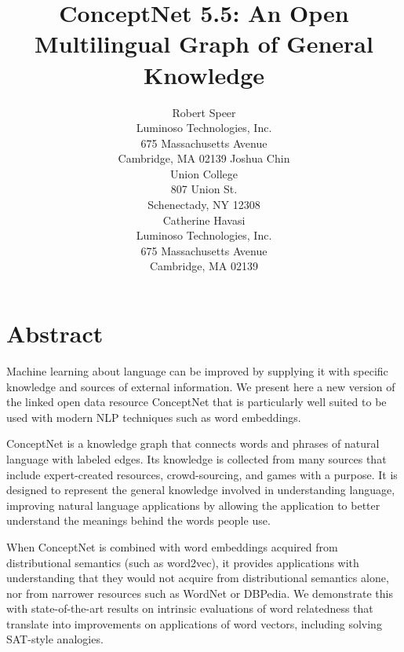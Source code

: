 \documentclass[letterpaper]{article}
\begin{document}
\title{ConceptNet 5.5: An Open Multilingual Graph of General Knowledge}
\author{Robert Speer\\
    Luminoso Technologies, Inc.\\
    675 Massachusetts Avenue\\
    Cambridge, MA 02139
\And
    Joshua Chin\\
    Union College\\
    807 Union St.\\
    Schenectady, NY 12308\\
\And
    Catherine Havasi\\
    Luminoso Technologies, Inc.\\
    675 Massachusetts Avenue\\
    Cambridge, MA 02139
}

\maketitle


\section{Abstract}\label{abstract}

Machine learning about language can be improved by supplying it with specific knowledge and sources of external information. We present here a new version of the linked open data resource ConceptNet that is particularly well suited to be used with modern NLP techniques such as word embeddings.

ConceptNet is a knowledge graph that connects words and phrases of natural language with labeled edges. Its knowledge is collected from many sources that include expert-created resources, crowd-sourcing, and games with a purpose. It is designed to represent the general knowledge involved in understanding language, improving natural language applications by allowing the application to better understand the meanings behind the words people use.

When ConceptNet is combined with word embeddings acquired from distributional semantics (such as word2vec), it provides applications with understanding that they would not acquire from distributional semantics alone, nor from narrower resources such as WordNet or DBPedia. We demonstrate this with state-of-the-art results on intrinsic evaluations of word relatedness that translate into improvements on applications of word vectors, including solving SAT-style analogies.
\end{document}
